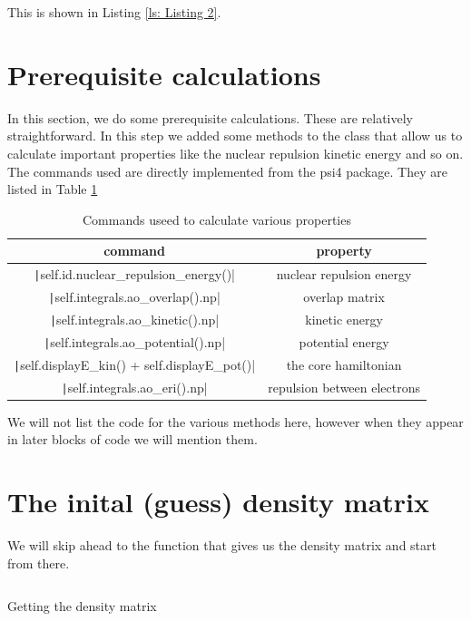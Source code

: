 \documentclass[%
    paper=A4,               %
    twoside=true,           %
    openany,              %
    parskip=full,           %
    chapterprefix=true,     %
    11pt,                   %
    headings=normal,        %
    bibliography=totoc,     %
    listof=totoc,           %
    titlepage=on,           %
    captions=tableabove,    %
    draft=false,            %
]{scrreprt}
\numberwithin{equation}{section}
\begin{document}
    This is shown in Listing \ref{ls: Listing 2}. 
    
    \section{Prerequisite calculations}
    \label{sec:step2}
    
    In this section, we do some prerequisite calculations. These are relatively straightforward. In this step we added some methods to the class that allow us to calculate important properties like the nuclear repulsion kinetic energy and so on. The commands used are directly implemented from the psi4 package. They are listed in Table \ref{tab:my_label}
    
    \begin{table}[hp]
        \centering
        \begin{tabular}{c|c}
            command & property \\
            \hline
            \texttt|self.id.nuclear_repulsion_energy()| & nuclear repulsion energy \\
            \texttt|self.integrals.ao_overlap().np| & overlap matrix \\
            \texttt|self.integrals.ao_kinetic().np| & kinetic energy \\
            \texttt|self.integrals.ao_potential().np| & potential energy \\
            \texttt|self.displayE_kin() + self.displayE_pot()| & the core hamiltonian \\
            \texttt|self.integrals.ao_eri().np| & repulsion between electrons \\
        \end{tabular}
        \caption{Commands useed to calculate various properties}
        \label{tab:my_label}
    \end{table}
    We will not list the code for the various methods here, however when they appear in later blocks of code we will mention them.
    
    \section{The inital (guess) density matrix}
    \label{sec:step3}
    We will skip ahead to the function that gives us the density matrix and start from there.
    
    \begin{listing}[ht]
        \centering
        \inputminted[firstline=110, lastline=116, autogobble]{python}{Hartree_FockL.py}
        \caption{Getting the density matrix}
        \label{ls: Listing 3}
    \end{listing}
    
\end{document}
